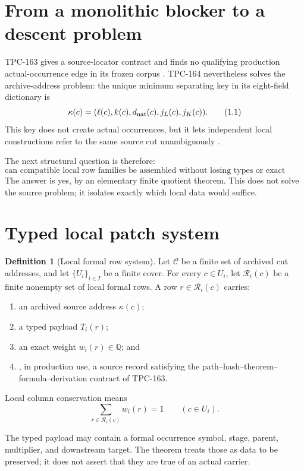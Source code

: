 \documentclass[11pt]{article}
\theoremstyle{definition}
\newtheorem{definition}[theorem]{Definition}
\theoremstyle{remark}
\newcommand{\Rows}{\mathcal R}
\newcommand{\Cuts}{\mathcal C}
\newcommand{\Q}{\mathbb Q}
\begin{document}
\section{From a monolithic blocker to a descent problem}

TPC-163 gives a source-locator contract and finds no qualifying
production actual-occurrence edge in its frozen corpus
\citep{WangTPC163}.  TPC-164 nevertheless solves the archive-address
problem: the unique minimum separating key in its eight-field
dictionary is
\[
 \kappa(c)=(\ell(c),k(c),d_{\rm nat}(c),j_L(c),j_K(c)).
 \tag{1.1}\label{eq:address}
\]
This key does not create actual occurrences, but it lets independent
local constructions refer to the same source cut unambiguously
\citep{WangTPC164}.

The next structural question is therefore:
\[
 \text{can compatible local row families be assembled without
 losing types or exact coefficients?}
\]
The answer is yes, by an elementary finite quotient theorem.  This
does not solve the source problem; it isolates exactly which local
data would suffice.

\section{Typed local patch system}

\begin{definition}[Local formal row system]\label{def:local}
Let \(\Cuts\) be a finite set of archived cut addresses, and let
\(\{U_i\}_{i\in I}\) be a finite cover.  For every \(c\in U_i\), let
\(\Rows_i(c)\) be a finite nonempty set of local formal rows.  A row
\(r\in\Rows_i(c)\) carries:
\begin{enumerate}[label=(\roman*),leftmargin=2.1em]
 \item an archived source address \(\kappa(c)\);
 \item a typed payload \(T_i(r)\);
 \item an exact weight \(w_i(r)\in\Q\); and
 \item, in production use, a source record satisfying the
       path--hash--theorem--formula--derivation contract of TPC-163.
\end{enumerate}
Local column conservation means
\[
 \sum_{r\in\Rows_i(c)}w_i(r)=1
 \qquad(c\in U_i).
 \tag{2.1}\label{eq:local-conservation}
\]
\end{definition}

The typed payload may contain a formal occurrence symbol, stage,
parent, multiplier, and downstream target.  The theorem treats those
as data to be preserved; it does not assert that they are true of an
actual carrier.
\end{document}
